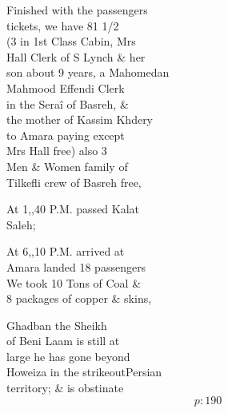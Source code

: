 \documentclass{report}
\begin{document}
	\par{
 	Finished with the passengers\ \\tickets, we have 81 1/2\ \\(3 in 1st Class Cabin, Mrs\ \\Hall Clerk of S Lynch \& her\ \\son about 9 years, a Mahomedan\ \\Mahmood Effendi Clerk\ \\in the Seraî of Basreh, \&\ \\the mother of Kassim Khdery\ \\to Amara paying except\ \\Mrs Hall free) also 3\ \\Men \& Women family of\ \\Tilkefli crew of Basreh free,\ \\
	}

	\par{
 	At 1,,40 P.M. passed Kalat\ \\Saleh;\ \\
	}

	\par{
 	At 6,,10 P.M. arrived at\ \\Amara landed 18 passengers\ \\We took 10 Tons of Coal \&\ \\8 packages of copper \& skins,\ \\
	}

	\par{
 	Ghadban the Sheikh\ \\of Beni Laam is still at\ \\large he has gone beyond\ \\Howeiza in the \lbrack strikeout\rbrack Persian\ \\territory; \& is obstinate\ \\
  \[p: 190 \]

	}

\end{document}
